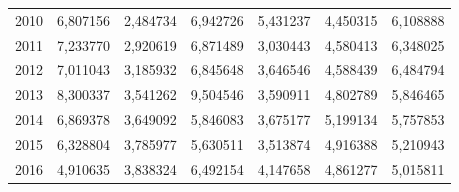 \begin{table}
\begin{tabular}{p{1cm}p{2cm}p{2cm}p{2cm}p{2cm}p{2cm}p{2cm}}
 2010 &                                           6,807156 &        2,484734 &         6,942726 &  5,431237 &                                  4,450315 &           6,108888 \\
 2011 &                                           7,233770 &        2,920619 &         6,871489 &  3,030443 &                                  4,580413 &           6,348025 \\
 2012 &                                           7,011043 &        3,185932 &         6,845648 &  3,646546 &                                  4,588439 &           6,484794 \\
 2013 &                                           8,300337 &        3,541262 &         9,504546 &  3,590911 &                                  4,802789 &           5,846465 \\
 2014 &                                           6,869378 &        3,649092 &         5,846083 &  3,675177 &                                  5,199134 &           5,757853 \\
 2015 &                                           6,328804 &        3,785977 &         5,630511 &  3,513874 &                                  4,916388 &           5,210943 \\
 2016 &                                           4,910635 &        3,838324 &         6,492154 &  4,147658 &                                  4,861277 &           5,015811 \\
\bottomrule
\end{tabular}
\end{table}
